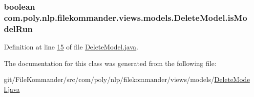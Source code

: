 \hypertarget{classcom_1_1poly_1_1nlp_1_1filekommander_1_1views_1_1models_1_1_delete_model_a539d8d947cd5217ffb0ba4dfd1e7661d}{
\subsubsection[{is\-Model\-Run}]{\setlength{\rightskip}{0pt plus 5cm}boolean com.\-poly.\-nlp.\-filekommander.\-views.\-models.\-Delete\-Model.\-is\-Model\-Run\hspace{0.3cm}{\ttfamily [private]}}}\label{classcom_1_1poly_1_1nlp_1_1filekommander_1_1views_1_1models_1_1_delete_model_a539d8d947cd5217ffb0ba4dfd1e7661d}


Definition at line \hyperlink{L15}{15} of file \hyperlink{}{Delete\-Model.\-java}.



The documentation for this class was generated from the following file\-:\begin{DoxyCompactItemize}
\item 
git/\-File\-Kommander/src/com/poly/nlp/filekommander/views/models/\hyperlink{_delete_model_8java}{Delete\-Model.\-java}\end{DoxyCompactItemize}
